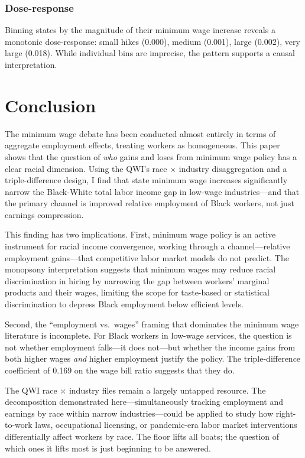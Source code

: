 \documentclass[12pt]{article}
\begin{document}
\subsubsection*{Dose-response} Binning states by the magnitude of their minimum wage increase reveals a monotonic dose-response: small hikes (0.000), medium (0.001), large (0.002), very large (0.018). While individual bins are imprecise, the pattern supports a causal interpretation.

\label{apep_main_text_end}

\section{Conclusion}
\label{sec:conclusion}

The minimum wage debate has been conducted almost entirely in terms of aggregate employment effects, treating workers as homogeneous. This paper shows that the question of \textit{who} gains and loses from minimum wage policy has a clear racial dimension. Using the QWI's race $\times$ industry disaggregation and a triple-difference design, I find that state minimum wage increases significantly narrow the Black-White total labor income gap in low-wage industries---and that the primary channel is improved relative employment of Black workers, not just earnings compression.

This finding has two implications. First, minimum wage policy is an active instrument for racial income convergence, working through a channel---relative employment gains---that competitive labor market models do not predict. The monopsony interpretation suggests that minimum wages may reduce racial discrimination in hiring by narrowing the gap between workers' marginal products and their wages, limiting the scope for taste-based or statistical discrimination to depress Black employment below efficient levels.

Second, the ``employment vs.\ wages'' framing that dominates the minimum wage literature is incomplete. For Black workers in low-wage services, the question is not whether employment falls---it does not---but whether the income gains from both higher wages \textit{and} higher employment justify the policy. The triple-difference coefficient of 0.169 on the wage bill ratio suggests that they do.

The QWI race $\times$ industry files remain a largely untapped resource. The decomposition demonstrated here---simultaneously tracking employment and earnings by race within narrow industries---could be applied to study how right-to-work laws, occupational licensing, or pandemic-era labor market interventions differentially affect workers by race. The floor lifts all boats; the question of which ones it lifts most is just beginning to be answered.
\end{document}
